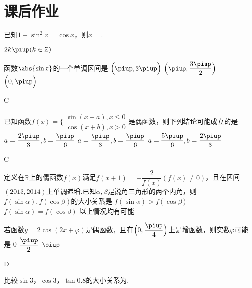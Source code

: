 \section{课后作业}
  \begin{exercise}
    \item%
      已知$1+\sin^2x=\cos x$，则$x=$\tk.
      \begin{answer}
        $2k\piup(k\in\mathbb{Z})$
      \end{answer}
    \item%
      函数$\abs{\sin x}$的一个单调区间是\xz
        {$\Bigl(\piup,2\piup\Bigr)$}
        {$\Bigl(\piup,\dfrac{3\piup}2\Bigr)$}
        {$\Bigl(0,\piup\Bigr)$}
      \begin{answer}
        C
      \end{answer}
    \item%
       已知函数$f(x)=\Bigg\{\begin{aligned}
      \sin(x+a),x\le 0\\\cos (x+b),x>0
      \end{aligned}$是偶函数，则下列结论可能成立的是\xz
        {$ a=\dfrac{2\piup}{3},b=\dfrac{\piup}{6}$}
        {$a=\dfrac{\piup}{3},b=\dfrac{\piup}{6} $}
        {$ a=\dfrac{5\piup}{6},b=\dfrac{2\piup}{3}$}
      \begin{answer}
        C
      \end{answer}
    \item%
      定义在$\mathbb{R}$上的偶函数$f(x)$满足$f(x+1)=-\dfrac2{f(x)}(f(x)\neq0)$，且在区间$(2013,2014)$上单调递增.已知$\alpha,\beta$是锐角三角形的两个内角，则$f(\sin\alpha),f(\cos\beta)$的大小关系是\xz
        {$f(\sin\alpha)>f(\cos\beta)$}
        {$f(\sin\alpha)=f(\cos\beta)$}
        {以上情况均有可能}
    \item%
      若函数$y=2\cos(2x+\varphi)$是偶函数，且在$\Bigl(0,\dfrac{\piup}4\Bigr)$上是增函数，则实数$\varphi$可能是\xz
        {0}
        {{$\dfrac{\piup}2$}}
        {$\piup$}
      \begin{answer}
        D
      \end{answer}
    \item%
      比较$\sin 3$，$\cos 3$，$\tan 0.8$的大小关系为\tk.

\end{exercise}
